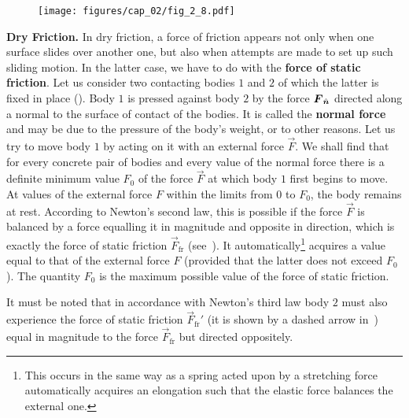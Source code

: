 \begin{figure}[t]
	\begin{center}
		\texttt{[image: figures/cap\_02/fig\_2\_8.pdf]}
		\caption[]{}
		\label{fig:2_8}
	\end{center}
	\vspace{-0.7cm}
\end{figure}

\textbf{Dry Friction.} In dry friction, a force of friction appears not only when one surface slides over another one, but also when attempts are made to set up such sliding motion. In the latter case, we have to do with the \textbf{force of static friction}. Let us consider two contacting bodies $1$ and $2$ of which the latter is fixed in place (). Body $1$ is pressed against body $2$ by the force $\boldsymbol{F}_{\hat{\boldsymbol{n}}}$ directed along a normal to the surface of contact of the bodies. It is called the \textbf{normal force} and may be due to the pressure of the body's weight, or to other reasons. Let us try to move body $1$ by acting on it with an external force $\vec{F}$. We shall find that for every concrete pair of bodies and every value of the normal force there is a definite minimum value $F_0$ of the force $\vec{F}$ at which body $1$ first begins to move. At values of the external force $F$ within the limits from $0$ to $F_0$, the body remains at rest. According to Newton's second law, this is possible if the force $\vec{F}$ is balanced by a force equalling it in magnitude and opposite in direction, which is exactly the force of static friction $\vec{F}_{\text{fr}}$ (see~). It automatically\footnote{This occurs in the same way as a spring acted upon by a stretching force automatically acquires an elongation such that the elastic force balances the external one.} acquires a value equal to that of the external force $F$ (provided that the latter does not exceed $F_0$). The quantity $F_0$ is the maximum possible value of the force of static friction.

It must be noted that in accordance with Newton's third law body $2$ must also experience the force of static friction $\vec{F}_{\text{fr}}'$ (it is shown by a dashed arrow in~) equal in magnitude to the force $\vec{F}_{\text{fr}}$ but directed oppositely.


